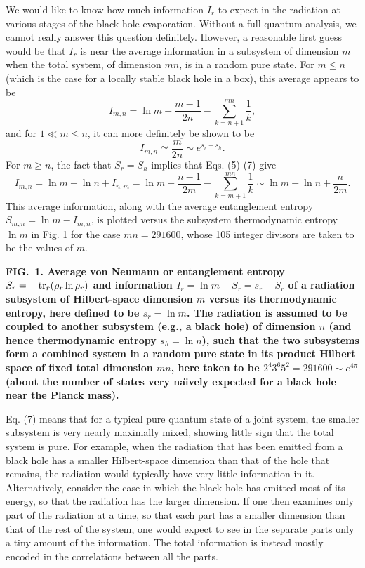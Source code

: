 	We would like to know how much information $I_r$ to expect in
the
radiation at various stages of the black hole evaporation.  Without a
full
quantum analysis, we cannot really answer this question definitely.
However, a reasonable first guess would be that $I_r$ is near the
average
information in a subsystem of dimension $m$ when the total system,
of dimension $mn$, is in a random pure state.  For $m \leq n$
(which is the case for a locally stable black hole in a box), this
average
appears to be \cite{PagEnt}
	\begin{equation}
	I_{m,n}=\ln m + \frac{m-1}{2n}-\sum_{k=n+1}^{mn}\frac{1}{k},
	\end{equation}
and for $1 \ll m \leq n$, it can more definitely be shown to be
\cite{PagEnt}
	\begin{equation}
	I_{m,n} \simeq \frac{m}{2n} \sim e^{s_r - s_h}.
	\end{equation}
For $m \geq n$, the fact that $S_r=S_h$ implies that Eqs. (5)-(7)
give
	\begin{equation}
	I_{m,n}=\ln m - \ln n + I_{n,m}
	= \ln m + \frac{n-1}{2m}-\sum_{k=m+1}^{mn}\frac{1}{k}
	\sim \ln m - \ln n + \frac{n}{2m}.
	\end{equation}
This average information, along with the average entanglement
entropy $S_{m,n} = \ln m - I_{m,n}$, is plotted versus the subsystem
thermodynamic entropy $\ln m$ in Fig. 1 for the case $mn=291600$,
whose 105 integer divisors are taken to be the values of $m$.

\vspace{1.5 cm}
\centerline{}
\bigskip
\noindent
{\bf FIG.~1.  Average von Neumann or entanglement entropy $S_r  =
-\mathop{\hbox{tr}}_r (\rho_{r} \ln \rho_{r})$ and information
$I_r = \ln m -S_r = s_r - S_r$ of a radiation subsystem of
Hilbert-space dimension $m$ versus its thermodynamic entropy,
here defined to be $s_r = \ln m$.  The radiation is assumed to be
coupled to another subsystem (e.g., a black hole) of dimension $n$
(and hence thermodynamic entropy $s_h = \ln n$), such that the
two subsystems form a combined system in a random pure state in
its product Hilbert space of fixed total dimension $mn$,
here taken to be $2^4 3^6 5^2 = 291600\sim e^{4\pi}$
(about the number of states very na\"{\i}vely expected for
a black hole near the Planck mass).}

\newpage
	Eq. (7) means that for a typical pure quantum state of a
joint
system, the smaller subsystem is very nearly maximally mixed,
showing little sign that the total system is pure.  For example,
when the radiation that has been emitted from a black hole has
a smaller Hilbert-space dimension than that of the hole that remains,
the radiation would typically have very little information in it.
Alternatively, consider the case in which the black hole has emitted
most of its energy, so that the radiation has the larger dimension.
If one then examines only part of the radiation at a time, so that
each part has a smaller dimension than that of the rest of the
system,
one would expect to see in the separate parts only a tiny amount
of the information.  The total information is instead mostly encoded
in the correlations between all the parts.

